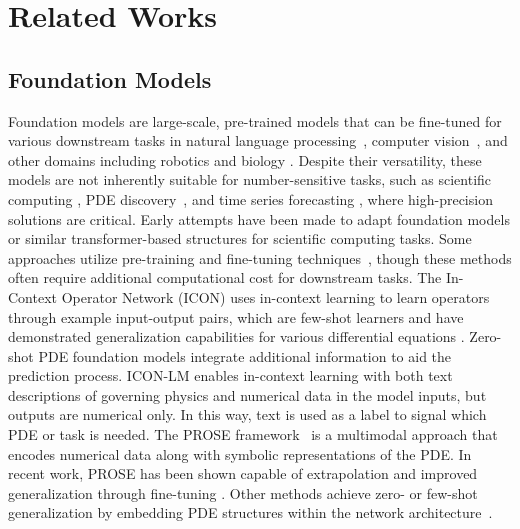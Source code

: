 \section{Related Works}
\subsection{Foundation Models}
Foundation models are large-scale, pre-trained models that can be fine-tuned for various downstream tasks in natural language processing~\cite{brown2020language,touvron2023llama}, computer vision~\cite{ramesh2021zero}, and other domains including robotics and biology \cite{firoozi2023foundation, zhang2024scientific}. Despite their versatility, these models are not inherently suitable for number-sensitive tasks, such as scientific computing \cite{wang2024recent}, PDE discovery~\cite{schaeffer2017learning}, and time series forecasting \cite{tan2024language}, where high-precision solutions are critical.
Early attempts have been made to adapt foundation models or similar transformer-based structures for scientific computing tasks. Some approaches utilize pre-training and fine-tuning techniques~\cite{chen2024data,herde2024poseidon}, though these methods often require additional computational cost for downstream tasks.
The In-Context Operator Network (ICON) \cite{yang2023context, yang2023fine, yang2024pde,cao2024vicon} uses in-context learning to learn operators through example input-output pairs, which are few-shot learners and have demonstrated generalization capabilities for various differential equations \cite{yang2024pde}. Zero-shot PDE foundation models integrate additional information to aid the prediction process. ICON-LM \cite{yang2023fine} enables in-context learning with both text descriptions of governing physics and numerical data in the model inputs, but outputs are numerical only. In this way, text is used as a label to signal which PDE or task is needed. The PROSE framework~\cite{liu2024prose,sun2024towards,liu2024prosefd,jollie2024time} is a multimodal approach that encodes numerical data along with symbolic representations of the PDE. In recent work, PROSE has been shown capable of extrapolation \cite{sun2024towards} and improved generalization through fine-tuning \cite{sun2024lemon}.
Other methods achieve zero- or few-shot generalization by embedding PDE structures within the network architecture~\cite{lorsung2024physics,ye2024pdeformer}.


